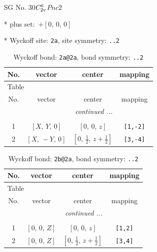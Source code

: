 \documentclass[fleqn,8pt]{jsarticle}
\begin{document}
\setcounter{MaxMatrixCols}{32}

\renewcommand{\tablename}{Table~}
\renewcommand{\figurename}{Figure~}
\begin{center}
\LARGE
SG No. 30\quad$C_{\rm 2v}^{6}$\quad$Pnc2$\quad[ orthorhombic ]
\end{center}

* plus set:\,\,\,$+\left[ 0,\, 0,\, 0 \right]$


* Wyckoff site: {\tt 2a}, site symmetry: {\tt ..2}
\renewcommand{\arraystretch}{1.2}
\begin{longtable}{cccc}
\caption{Wyckoff bond: {\tt 2a@2a}, bond symmetry: {\tt ..2}}
 \\
 \hline \hline
No. & vector & center & mapping \\ \hline \endfirsthead

\multicolumn{3}{l}{\tablename\ \thetable{}} \\
 \hline \hline
No. & vector & center & mapping \\ \hline \endhead

 \hline \hline
\multicolumn{3}{r}{\footnotesize\it continued ...} \\ \endfoot

 \hline \hline
\multicolumn{3}{r}{} \\ \endlastfoot

1 & $\left[ X,\, Y,\, 0 \right]$ & $\left[ 0,\, 0,\, z \right]$ & {\tt [1,-2]} \\ \hline
2 & $\left[ X,\, - Y,\, 0 \right]$ & $\left[ 0,\, \frac{1}{2},\, z + \frac{1}{2} \right]$ & {\tt [3,-4]} \\
\end{longtable}
\renewcommand{\arraystretch}{1.2}
\begin{longtable}{cccc}
\caption{Wyckoff bond: {\tt 2b@2a}, bond symmetry: {\tt ..2}}
 \\
 \hline \hline
No. & vector & center & mapping \\ \hline \endfirsthead

\multicolumn{3}{l}{\tablename\ \thetable{}} \\
 \hline \hline
No. & vector & center & mapping \\ \hline \endhead

 \hline \hline
\multicolumn{3}{r}{\footnotesize\it continued ...} \\ \endfoot

 \hline \hline
\multicolumn{3}{r}{} \\ \endlastfoot

1 & $\left[ 0,\, 0,\, Z \right]$ & $\left[ 0,\, 0,\, z \right]$ & {\tt [1,2]} \\ \hline
2 & $\left[ 0,\, 0,\, Z \right]$ & $\left[ 0,\, \frac{1}{2},\, z + \frac{1}{2} \right]$ & {\tt [3,4]} \\
\end{longtable}
\end{document}
